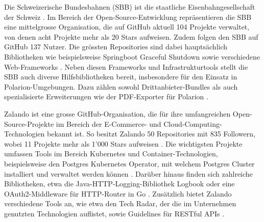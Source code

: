 Die Schweizerische Bundesbahnen (SBB) ist die staatliche Eisenbahngesellschaft der Schweiz \parencite{uvek_verkehr_energie_und_kommunikation_eidgenossisches_departement_fur_umwelt_schweizerische_nodate}. Im Bereich der Open-Source-Entwicklung repräsentieren die SBB eine mittelgrosse Organisation, die auf GitHub aktuell 104 Projekte verwaltet, von denen acht Projekte mehr als 20 Stars aufweisen. Zudem folgen den SBB auf GitHub 137 Nutzer. Die grössten Repositories sind dabei hauptsächlich Bibliotheken wie beispielsweise Springboot Graceful Shutdown sowie verschiedene Web-Frameworks \parencite{noauthor_schweizerischebundesbahnenspringboot-graceful-shutdown_2025}\parencite{noauthor_schweizerischebundesbahnenscion-workbench_2025}\parencite{noauthor_schweizerischebundesbahnenscion-microfrontend-platform_2025}. Neben diesen Frameworks und Infrastrukturtools stellt die SBB auch diverse Hilfsbibliotheken bereit, insbesondere für den Einsatz in Polarion-Umgebungen. Dazu zählen sowohl Drittanbieter-Bundles \parencite{noauthor_schweizerischebundesbahnenchsbbpolarionthirdpartybundles_nodate} als auch spezialisierte Erweiterungen wie der PDF-Exporter für Polarion \parencite{noauthor_schweizerischebundesbahnenchsbbpolarionextensionpdf-exporter_2025}\parencite{noauthor_swiss_nodate}.


Zalando ist eine grosse GitHub-Organisation, die für ihre umfangreichen Open-Source-Projekte im Bereich der E-Commerce- und Cloud-Computing-Technologien bekannt ist. So besitzt Zalando 50 Repositories mit 835 Followern, wobei 11 Projekte mehr als 1'000 Stars aufweisen \parencite{noauthor_zalando_nodate}. Die wichtigsten Projekte umfassen Tools im Bereich Kubernetes und Container-Technologien, beispielsweise den Postgres Kubernetes Operator, mit welchem Postgres Cluster installiert und verwaltet werden können \parencite{noauthor_zalandopostgres-operator_2025}. Darüber hinaus finden sich zahlreiche Bibliotheken, etwa die Java-HTTP-Logging-Bibliothek Logbook oder eine OAuth2-Middleware für HTTP-Router in Go \parencite{noauthor_zalandologbook_2025}\parencite{noauthor_zalandogin-oauth2_nodate}. Zusätzlich bietet Zalando verschiedene Tools an, wie etwa den Tech Radar, der die im Unternehmen genutzten Technologien auflistet, sowie Guidelines für RESTful APIs \parencite{noauthor_zalandotech-radar_nodate}\parencite{noauthor_zalandorestful-api-guidelines_nodate}.
